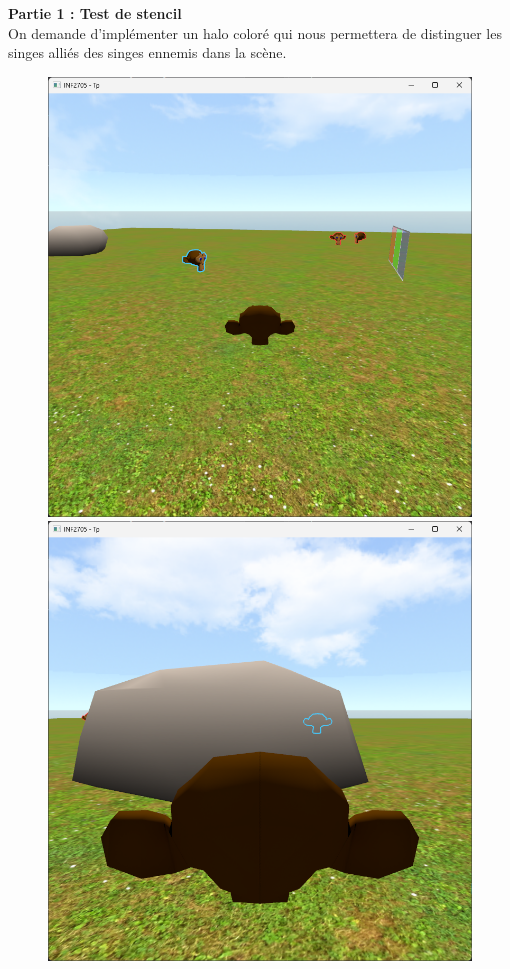 \documentclass{article}[letterpaper, 11pt]
\begin{document}
\newpage
\textbf{Partie 1 : Test de stencil}\vspace{11pt}\\
On demande d'implémenter un halo coloré qui nous permettera de distinguer les singes alliés des singes ennemis dans la scène.
\begin{figure}[h]
	\begin{minipage}[c]{.49\linewidth}
		 \centering
		 \includegraphics[scale = 0.25]{image_1.png}
	\end{minipage}
	\begin{minipage}[c]{.49\linewidth}
		 \centering
		 \includegraphics[scale = 0.25]{image_2.png}

\end{minipage}
\end{figure}
\end{document}
